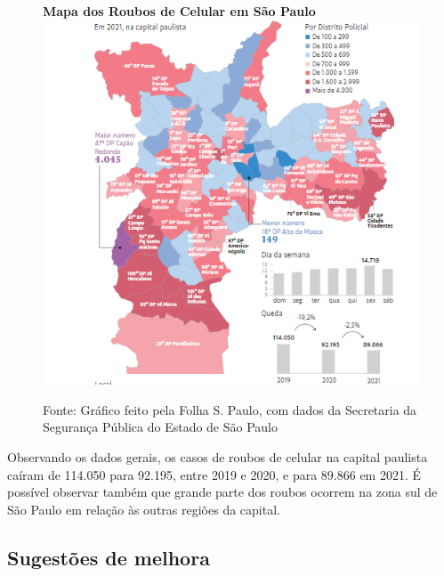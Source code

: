         \begin{figure}[H]
            \centering
            \textbf{Mapa dos Roubos de Celular em São Paulo}
            \includegraphics[scale=0.7]{img/mapa_dos_roubos_de_celular_em_sp.png}
            \caption{Fonte: Gráfico feito pela Folha S. Paulo, com dados da Secretaria da Segurança Pública do Estado de São Paulo}
        \end{figure}

        Observando os dados gerais, os casos de roubos de celular na capital paulista caíram
        de 114.050 para 92.195, entre 2019 e 2020, e para 89.866 em 2021. É possível observar
        também que grande parte dos roubos ocorrem na zona sul de São Paulo em relação às
        outras regiões da capital.

    \subsection{Sugestões de melhora}

